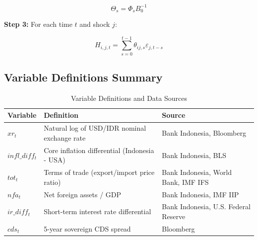 \documentclass[11pt,a4paper]{article}
\begin{document}
\begin{equation}
\Theta_s = \Phi_s B_0^{-1}
\end{equation}

\textbf{Step 3:} For each time $t$ and shock $j$:

\begin{equation}
H_{i,j,t} = \sum_{s=0}^{t-1} \theta_{ij,s} \varepsilon_{j,t-s}
\end{equation}

\subsection{Variable Definitions Summary}

\begin{table}[H]
\centering
\caption{Variable Definitions and Data Sources}
\label{tab:variables}
\begin{tabular}{p{} p{} p{}}
\toprule
\textbf{Variable} & \textbf{Definition} & \textbf{Source} \\
\midrule
$xr_t$ & Natural log of USD/IDR nominal exchange rate & Bank Indonesia, Bloomberg \\
$infl\_diff_t$ & Core inflation differential (Indonesia - USA) & Bank Indonesia, BLS \\
$tot_t$ & Terms of trade (export/import price ratio) & Bank Indonesia, World Bank, IMF IFS \\
$nfa_t$ & Net foreign assets / GDP & Bank Indonesia, IMF IIP \\
$ir\_diff_t$ & Short-term interest rate differential & Bank Indonesia, U.S. Federal Reserve \\
$cds_t$ & 5-year sovereign CDS spread & Bloomberg \\
\bottomrule
\end{tabular}
\end{table}

\newpage



\end{document}
